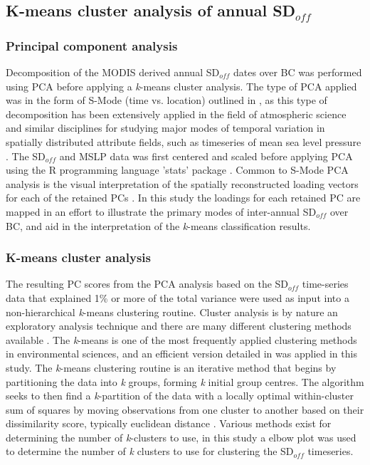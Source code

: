 \documentclass{tATO2e}
\newcommand{\sdoff}{SD$_{off}$}
\begin{document}
\subsection{K-means cluster analysis of annual \sdoff{}}\label{kmeans}

\subsubsection{Principal component analysis}\label{sdoffpca}
Decomposition of the MODIS derived annual \sdoff{} dates over BC was performed using PCA before applying a \textit{k}-means cluster analysis. The type of PCA applied was in the form of S-Mode (time vs. location) outlined in \cite{Richman1986}, as this type of decomposition has been extensively applied in the field of atmospheric science and similar disciplines for studying major modes of temporal variation in spatially distributed attribute fields, such as timeseries of mean sea level pressure \citep{Urska2013}. The \sdoff{} and MSLP data was first centered and scaled before applying PCA using the R programming language 'stats' package \citep{r_stats}. Common to S-Mode PCA analysis is the visual interpretation of the spatially reconstructed loading vectors for each of the retained PCs \citep{Urska2013}. In this study the loadings for each retained PC are mapped in an effort to illustrate the primary modes of inter-annual \sdoff{} over BC, and aid in the interpretation of the \textit{k}-means classification results. 

\subsubsection{K-means cluster analysis}
The resulting PC scores from the PCA analysis based on the \sdoff{} time-series data that explained 1\% or more of the total variance were used as input into a non-hierarchical \textit{k}-means clustering routine. Cluster analysis is by nature an exploratory analysis technique and there are many different clustering methods available \citep{Gotelli2013}. The \textit{k}-means is one of the most frequently applied clustering methods in environmental sciences, and an efficient version detailed in \cite{Hartigan1979} was applied in this study. The \textit{k}-means clustering routine is an iterative method that begins by partitioning the data into \textit{k} groups, forming \textit{k} initial group centres. The algorithm seeks to then find a \textit{k}-partition of the data with a locally optimal within-cluster sum of squares by moving observations from one cluster to another based on their dissimilarity score, typically euclidean distance \citep{Hartigan1979}. Various methods exist for determining the number of \textit{k}-clusters to use, in this study a elbow plot was used to determine the number of \textit{k} clusters to use for clustering the \sdoff{} timeseries. 
\end{document}
